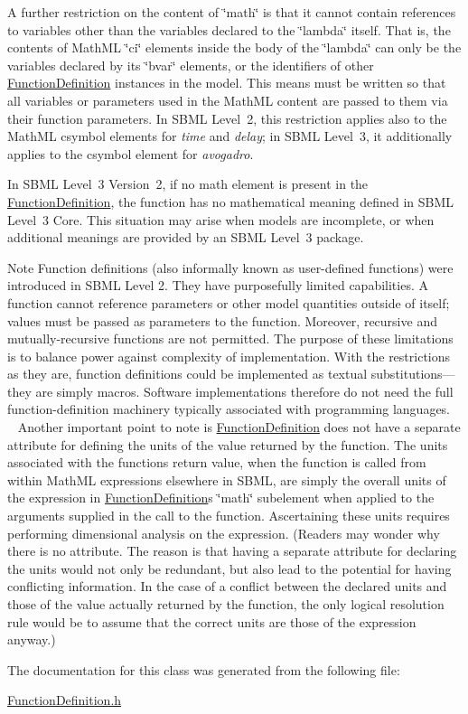 A further restriction on the content of \char`\"{}math\char`\"{} is that it cannot contain references to variables other than the variables declared to the \char`\"{}lambda\char`\"{} itself. That is, the contents of Math\+ML \char`\"{}ci\char`\"{} elements inside the body of the \char`\"{}lambda\char`\"{} can only be the variables declared by its \char`\"{}bvar\char`\"{} elements, or the identifiers of other \hyperlink{class_function_definition}{Function\+Definition} instances in the model. This means must be written so that all variables or parameters used in the Math\+ML content are passed to them via their function parameters. In S\+B\+ML Level~2, this restriction applies also to the Math\+ML {\ttfamily csymbol} elements for {\itshape time} and {\itshape delay}; in S\+B\+ML Level~3, it additionally applies to the {\ttfamily csymbol} element for {\itshape avogadro}.

In S\+B\+ML Level~3 Version~2, if no math element is present in the \hyperlink{class_function_definition}{Function\+Definition}, the function has no mathematical meaning defined in S\+B\+ML Level~3 Core. This situation may arise when models are incomplete, or when additional meanings are provided by an S\+B\+ML Level~3 package.

\begin{DoxyNote}{Note}
Function definitions (also informally known as user-\/defined functions) were introduced in S\+B\+ML Level 2. They have purposefully limited capabilities. A function cannot reference parameters or other model quantities outside of itself; values must be passed as parameters to the function. Moreover, recursive and mutually-\/recursive functions are not permitted. The purpose of these limitations is to balance power against complexity of implementation. With the restrictions as they are, function definitions could be implemented as textual substitutions---they are simply macros. Software implementations therefore do not need the full function-\/definition machinery typically associated with programming languages. ~\newline
~\newline
 Another important point to note is \hyperlink{class_function_definition}{Function\+Definition} does not have a separate attribute for defining the units of the value returned by the function. The units associated with the function\textquotesingle{}s return value, when the function is called from within Math\+ML expressions elsewhere in S\+B\+ML, are simply the overall units of the expression in \hyperlink{class_function_definition}{Function\+Definition}\textquotesingle{}s \char`\"{}math\char`\"{} subelement when applied to the arguments supplied in the call to the function. Ascertaining these units requires performing dimensional analysis on the expression. (Readers may wonder why there is no attribute. The reason is that having a separate attribute for declaring the units would not only be redundant, but also lead to the potential for having conflicting information. In the case of a conflict between the declared units and those of the value actually returned by the function, the only logical resolution rule would be to assume that the correct units are those of the expression anyway.) 
\end{DoxyNote}


The documentation for this class was generated from the following file\+:\begin{DoxyCompactItemize}
\item 
\hyperlink{_function_definition_8h}{Function\+Definition.\+h}\end{DoxyCompactItemize}
